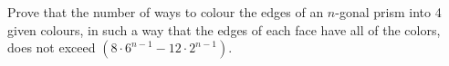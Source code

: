 \problem
Prove that the number of ways to colour the edges of an $n$-gonal prism into
4 given colours, in such a way that the edges of each face have all of the
colors, does not exceed $(8 \cdot 6^{n-1} - 12 \cdot 2^{n-1})$.
\solution
\endproblem
